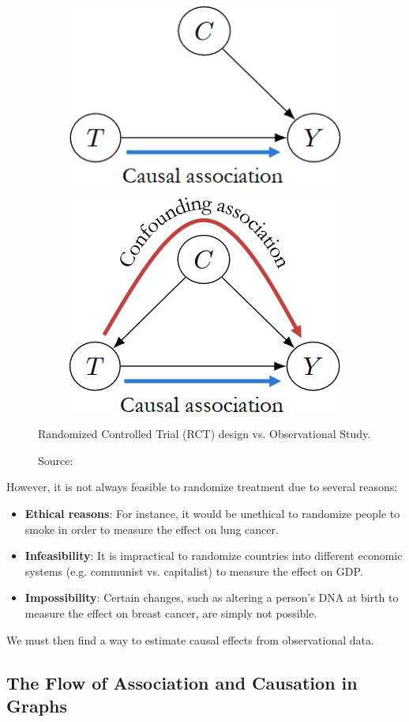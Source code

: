 \begin{figure}[h]
    \centering
    \begin{subfigure}{.5\textwidth}
      \centering
      \includegraphics[width=.7\linewidth]{figures/ch3/13.rct1.png}
    \end{subfigure}%
    \begin{subfigure}{.5\textwidth}
      \centering
      \includegraphics[width=.7\linewidth]{figures/ch3/14.rct2.png}
    \end{subfigure}
    \caption{Randomized Controlled Trial (RCT) design vs. Observational Study.}
    \vspace{-10px}
    \caption*{\scriptsize{Source: \cite{Neal_2020a}}}
    \label{fig:rct}
\end{figure}

However, it is not always feasible to randomize treatment due to several reasons:
\begin{itemize}
    \item \textbf{Ethical reasons}: For instance, it would be unethical
    to randomize people to smoke in order to measure the effect on lung cancer.
    \item \textbf{Infeasibility}: It is impractical to randomize
    countries into different economic systems
    (e.g. communist vs. capitalist) to measure the effect on GDP.
    \item \textbf{Impossibility}: Certain changes, such as altering a
    person's DNA at birth to measure the effect on breast cancer,
    are simply not possible.
\end{itemize}
We must then find a way to estimate causal effects from observational data.

\subsection{The Flow of Association and Causation in Graphs}

